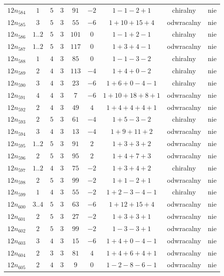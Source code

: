 \begin{longtable}{ccccccccc}
$12n_{584}$ & $1$ & $5$ & $3$ & $91$ & $-2$ & $1-1-2+1$ & chiralny & nie \\
$12n_{585}$ & $3$ & $5$ & $3$ & $55$ & $-6$ & $1+10+15+4$ & odwracalny & nie \\
$12n_{586}$ & $1..2$ & $5$ & $3$ & $101$ & $0$ & $1-1+2-1$ & chiralny & nie \\
$12n_{587}$ & $1..2$ & $5$ & $3$ & $117$ & $0$ & $1+3+4-1$ & odwracalny & nie \\
$12n_{588}$ & $1$ & $4$ & $3$ & $85$ & $0$ & $1-1-3-2$ & chiralny & nie \\
$12n_{589}$ & $2$ & $4$ & $3$ & $113$ & $-4$ & $1+4+0-2$ & chiralny & nie \\
$12n_{590}$ & $3$ & $4$ & $3$ & $23$ & $-6$ & $1+6+0-4-1$ & chiralny & nie \\
$12n_{591}$ & $4$ & $4$ & $3$ & $7$ & $-6$ & $1+10+18+8+1$ & odwracalny & nie \\
$12n_{592}$ & $2$ & $4$ & $3$ & $49$ & $4$ & $1+4+4+4+1$ & odwracalny & nie \\
$12n_{593}$ & $2$ & $5$ & $3$ & $61$ & $-4$ & $1+5-3-2$ & chiralny & nie \\
$12n_{594}$ & $3$ & $4$ & $3$ & $13$ & $-4$ & $1+9+11+2$ & odwracalny & nie \\
$12n_{595}$ & $1..2$ & $5$ & $3$ & $91$ & $2$ & $1+3+3+2$ & odwracalny & nie \\
$12n_{596}$ & $2$ & $5$ & $3$ & $95$ & $2$ & $1+4+7+3$ & odwracalny & nie \\
$12n_{597}$ & $1..2$ & $4$ & $3$ & $75$ & $-2$ & $1+3+4+2$ & chiralny & nie \\
$12n_{598}$ & $2$ & $5$ & $3$ & $99$ & $-2$ & $1+1-2+1$ & odwracalny & nie \\
$12n_{599}$ & $1$ & $4$ & $3$ & $55$ & $-2$ & $1+2-3-4-1$ & chiralny & nie \\
$12n_{600}$ & $3..4$ & $5$ & $3$ & $63$ & $-6$ & $1+12+15+4$ & odwracalny & nie \\
$12n_{601}$ & $2$ & $5$ & $3$ & $27$ & $-2$ & $1+3+3+1$ & odwracalny & nie \\
$12n_{602}$ & $2$ & $5$ & $3$ & $99$ & $-2$ & $1-3-3+1$ & odwracalny & nie \\
$12n_{603}$ & $3$ & $4$ & $3$ & $15$ & $-6$ & $1+4+0-4-1$ & odwracalny & nie \\
$12n_{604}$ & $2$ & $3$ & $3$ & $81$ & $4$ & $1+4+6+4+1$ & odwracalny & nie \\
$12n_{605}$ & $2$ & $4$ & $3$ & $9$ & $0$ & $1-2-8-6-1$ & odwracalny & nie \\

\end{longtable}
